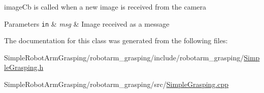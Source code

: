 image\-Cb is called when a new image is received from the camera 


\begin{DoxyParams}[1]{Parameters}
\mbox{\tt in}  & {\em msg} & Image received as a message \\
\hline
\end{DoxyParams}


The documentation for this class was generated from the following files\-:\begin{DoxyCompactItemize}
\item 
Simple\-Robot\-Arm\-Grasping/robotarm\-\_\-grasping/include/robotarm\-\_\-grasping/\hyperlink{_simple_grasping_8h}{Simple\-Grasping.\-h}\item 
Simple\-Robot\-Arm\-Grasping/robotarm\-\_\-grasping/src/\hyperlink{_simple_grasping_8cpp}{Simple\-Grasping.\-cpp}\end{DoxyCompactItemize}
